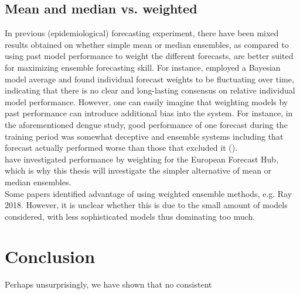 \documentclass[11pt]{article}
\begin{document}
\subsection{Mean and median vs. weighted}
In previous (epidemiological) forecasting experiment, there have been mixed results obtained on whether simple mean or median ensembles, as compared to using past model performance to weight the different forecasts, are better suited for maximizing ensemble forecasting skill. For instance, \cite{yamana_superensemble_2016} employed a Bayesian model average and found individual forecast weights to be fluctuating over time, indicating that there is no clear and long-lasting consensus on relative individual model performance. However, one can easily imagine that weighting models by past performance can introduce additional bias into the system. For instance, in the aforementioned dengue study, good performance of one forecast during the training period was somewhat deceptive and ensemble systems including that forecast actually performed worse than those that excluded it (\cite{yamana_superensemble_2016}).\\
\cite{sherratt_draft_nodate} have investigated performance by weighting for the European Forecast Hub, which is why this thesis will investigate the simpler alternative of mean or median ensembles. \\
Some papers identified advantage of using weighted ensemble methods, e.g. Ray 2018. However, it is unclear whether this is due to the small amount of models considered, with less sophisticated models thus dominating too much.
\section{Conclusion}
Perhaps unsurprisingly, we have shown that no consistent 
\newpage

\end{document}
